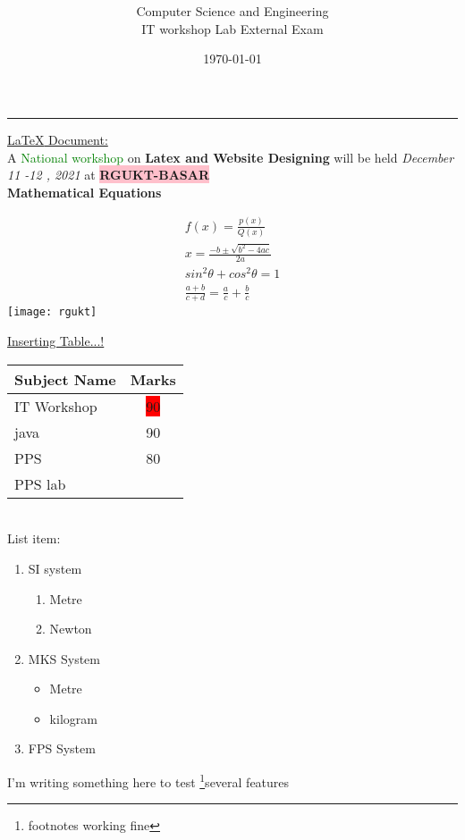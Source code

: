 \documentclass{article}
\title{\textbf{\color{red}{Rajiv Gandhi University of Knowledge Technologies}}}
\author{Computer Science and Engineering\\  IT workshop Lab External Exam}
\date{\today}
\begin{document}
\maketitle
\vspace{2mm}
\hrule
\vspace{2mm}
\underline{{\LaTeX}   Document:}
\\
\vspace{2mm}
A \textcolor{green}{National workshop} on \textbf{Latex and Website Designing} will be held \textit{December 11 -12 , 2021} at \colorbox{pink}{\textbf{RGUKT-BASAR}}\\
\vspace{1mm}
\textbf{Mathematical Equations}
\begin{center}
\begin{eqnarray}
f(x)=\frac{p(x)}{Q(x)}\\
x=\frac{-b\pm \sqrt{b^2-4ac}}{2a}\\
sin^2\theta+cos^2\theta=1\\
\frac{a+b}{c+d}=\frac{a}{c}+\frac{b}{c}
\end{eqnarray}
\texttt{[image: rgukt]}
\end{center}
\begin{flushleft}
\underline{Inserting Table...!}\\
\vspace{2mm}
\begin{tabular}{|l|c|}
\hline
\textbf{Subject Name} & \textbf{Marks}\\
\hline
IT Workshop & \colorbox{red}{90}\\
\hline
java & 90\\
\hline
PPS \multirow{2}{6em}&{80}\\ 
\cline{1-1}
PPS lab&\\
\hline
\end{tabular}\\
List item:
\begin{enumerate}
\item SI system
\begin{enumerate}
\item Metre
\item Newton
\end{enumerate}
\item MKS System
\begin{itemize}
\item Metre
\item kilogram
\end{itemize}
\item FPS System
\end{enumerate}
I'm writing something here to test  \footnote{footnotes working fine}{\small{several features}}
\end{flushleft}
\end{document}
